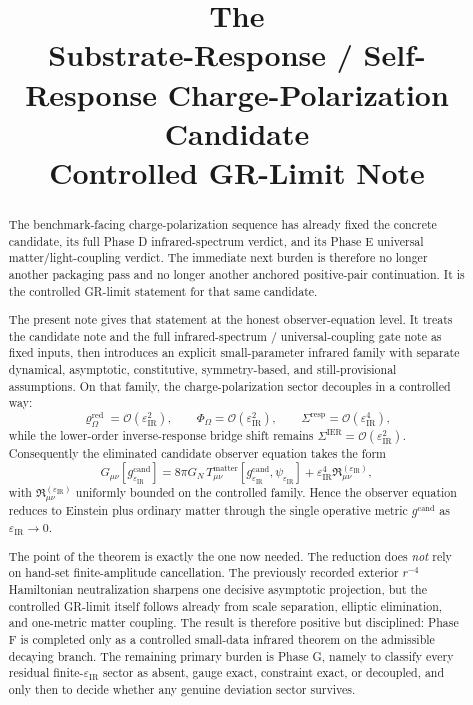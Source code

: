 \documentclass[11pt]{article}
\title{\textbf{The \TheoryName{}}\\[0.4em]
\large Substrate-Response / Self-Response Charge-Polarization Candidate\\
\large Controlled GR-Limit Note}
\author{}
\date{}
\newcommand{\CandidateMetric}{g^{\mathrm{cand}}}
\newcommand{\BaseShift}{\Sigma^{\mathrm{IER}}}
\newcommand{\ResponseShift}{\Sigma^{\mathrm{resp}}}
\newcommand{\FlowPot}{\Phi_\Omega}
\newcommand{\SourceDensityRed}{\varrho_\Omega^{\mathrm{red}}}
\newcommand{\IRsmall}{\varepsilon_{\mathrm{IR}}}
\begin{document}
\maketitle

\begin{abstract}
The benchmark-facing charge-polarization sequence has already fixed the concrete candidate, its full Phase D infrared-spectrum verdict, and its Phase E universal matter/light-coupling verdict. The immediate next burden is therefore no longer another packaging pass and no longer another anchored positive-pair continuation. It is the controlled GR-limit statement for that same candidate.

The present note gives that statement at the honest observer-equation level. It treats the candidate note and the full infrared-spectrum / universal-coupling gate note as fixed inputs, then introduces an explicit small-parameter infrared family with separate dynamical, asymptotic, constitutive, symmetry-based, and still-provisional assumptions. On that family, the charge-polarization sector decouples in a controlled way:
\[
\SourceDensityRed=\mathcal O(\IRsmall^2),
\qquad
\FlowPot=\mathcal O(\IRsmall^2),
\qquad
\ResponseShift=\mathcal O(\IRsmall^4),
\]
while the lower-order inverse-response bridge shift remains \(\BaseShift=\mathcal O(\IRsmall^2)\). Consequently the eliminated candidate observer equation takes the form
\[
G_{\mu\nu}[\CandidateMetric_{\IRsmall}]
=
8\pi G_N\,T_{\mu\nu}^{\mathrm{matter}}[\CandidateMetric_{\IRsmall},\psi_{\IRsmall}]
+ \IRsmall^4 \mathfrak R_{\mu\nu}^{(\IRsmall)},
\]
with \(\mathfrak R_{\mu\nu}^{(\IRsmall)}\) uniformly bounded on the controlled family. Hence the observer equation reduces to Einstein plus ordinary matter through the single operative metric \(\CandidateMetric\) as \(\IRsmall\to0\).

The point of the theorem is exactly the one now needed. The reduction does \emph{not} rely on hand-set finite-amplitude cancellation. The previously recorded exterior \(r^{-4}\) Hamiltonian neutralization sharpens one decisive asymptotic projection, but the controlled GR-limit itself follows already from scale separation, elliptic elimination, and one-metric matter coupling. The result is therefore positive but disciplined: Phase F is completed only as a controlled small-data infrared theorem on the admissible decaying branch. The remaining primary burden is Phase G, namely to classify every residual finite-\(\IRsmall\) sector as absent, gauge exact, constraint exact, or decoupled, and only then to decide whether any genuine deviation sector survives.
\end{abstract}
\end{document}
